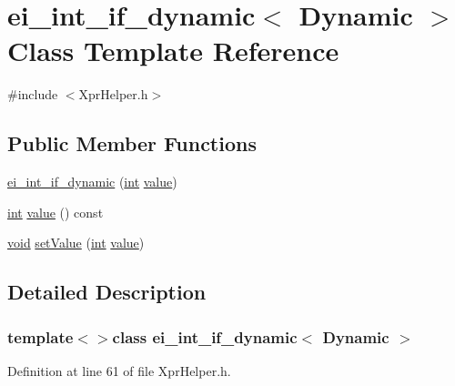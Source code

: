 \hypertarget{classei__int__if__dynamic_3_01_dynamic_01_4}{\section{ei\-\_\-int\-\_\-if\-\_\-dynamic$<$ Dynamic $>$ Class Template Reference}
\label{classei__int__if__dynamic_3_01_dynamic_01_4}
}


{\ttfamily \#include $<$Xpr\-Helper.\-h$>$}

\subsection*{Public Member Functions}
\begin{DoxyCompactItemize}
\item 
\hyperlink{classei__int__if__dynamic_3_01_dynamic_01_4_a8f9fe105c237b545c21b7b6a5e3525da}{ei\-\_\-int\-\_\-if\-\_\-dynamic} (\hyperlink{ioapi_8h_a787fa3cf048117ba7123753c1e74fcd6}{int} \hyperlink{glext_8h_aa0e2e9cea7f208d28acda0480144beb0}{value})
\item 
\hyperlink{ioapi_8h_a787fa3cf048117ba7123753c1e74fcd6}{int} \hyperlink{classei__int__if__dynamic_3_01_dynamic_01_4_a051b6688028ef489e65d726f2b1f1fac}{value} () const 
\item 
\hyperlink{group___u_a_v_objects_plugin_ga444cf2ff3f0ecbe028adce838d373f5c}{void} \hyperlink{classei__int__if__dynamic_3_01_dynamic_01_4_a435c2856926c8d2dc3e93123558bbfaf}{set\-Value} (\hyperlink{ioapi_8h_a787fa3cf048117ba7123753c1e74fcd6}{int} \hyperlink{glext_8h_aa0e2e9cea7f208d28acda0480144beb0}{value})
\end{DoxyCompactItemize}


\subsection{Detailed Description}
\subsubsection*{template$<$$>$class ei\-\_\-int\-\_\-if\-\_\-dynamic$<$ Dynamic $>$}



Definition at line 61 of file Xpr\-Helper.\-h.



